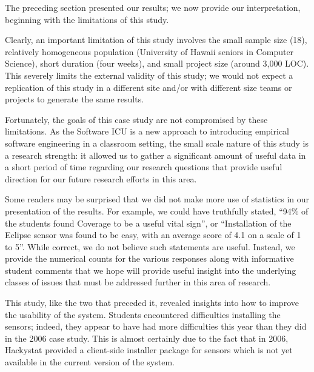 \documentclass[times,10pt,twocolumn]{article}
\begin{document}


\label{sec:discussion}

The preceding section presented our results; we now provide our interpretation, beginning with the limitations of this study.


Clearly, an important limitation of this study involves the small sample
size (18), relatively homogeneous population (University of Hawaii seniors
in Computer Science), short duration (four weeks), and small project size
(around 3,000 LOC).  This severely limits the external validity of this
study; we would not expect a replication of this study in a different site
and/or with different size teams or projects to generate the same results.

Fortunately, the goals of this case study are not compromised by these
limitations.  As the Software ICU is a new approach to introducing
empirical software engineering in a classroom setting, the small scale nature
of this study is a research strength: it allowed us to gather a significant
amount of useful data in a short period of time regarding our research
questions that provide useful direction for our future research efforts in
this area.

Some readers may be surprised that we did not make more use of statistics
in our presentation of the results.  For example, we could have truthfully
stated, ``94\% of the students found Coverage to be a useful vital sign'',
or ``Installation of the Eclipse sensor was found to be easy, with an
average score of 4.1 on a scale of 1 to 5''.  While correct, we do not
believe such statements are useful. Instead, we provide the numerical
counts for the various responses along with informative student comments
that we hope will provide useful insight into the underlying classes of
issues that must be addressed further in this area of research.


This study, like the two that preceded it, revealed insights into how to
improve the usability of the system.  Students encountered difficulties
installing the sensors; indeed, they appear to have had more difficulties
this year than they did in the 2006 case study.  This is almost certainly
due to the fact that in 2006, Hackystat provided a client-side installer
package for sensors which is not yet available in the current version of
the system.
\end{document}
